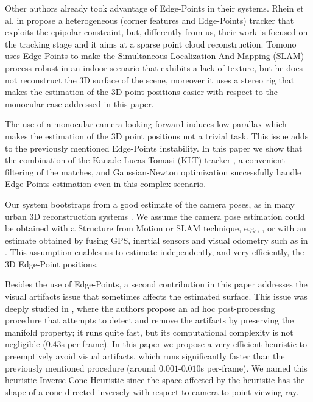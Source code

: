 Other authors \cite{Rhein_et_al13, Tomono09} already took advantage of Edge-Points in their systems. Rhein et al. in \cite{Rhein_et_al13} propose a heterogeneous (corner features and Edge-Points) tracker that exploits the epipolar constraint, but, differently from us, their work is focused on the tracking stage and it aims at a sparse point cloud reconstruction.
Tomono \cite{Tomono09}  uses Edge-Points to make  the Simultaneous Localization And Mapping (SLAM) process robust in an indoor scenario that exhibits a lack of texture, but he does not reconstruct the 3D surface of the scene, moreover it uses a stereo rig that makes the estimation of the 3D point positions easier with respect to the monocular case addressed in this paper.

The use of a monocular camera looking forward induces low parallax which makes  the estimation of the 3D point positions not a trivial task. This issue adds to the previously mentioned Edge-Points instability. 
In this paper we show that the combination of the  Kanade-Lucas-Tomasi (KLT) tracker \cite{Lucas_Kanade81}, a convenient filtering of the matches, and Gaussian-Newton optimization successfully handle Edge-Points estimation even in this complex scenario. 

Our system bootstraps from a good estimate of the camera poses, as in many urban 3D reconstruction systems \cite{ Pollefeys_et_al_08, Cornelis_et_al08}. 
We assume the camera pose estimation could be obtained with a Structure from Motion or SLAM technique, e.g., \cite{Snavely_et_al06},  or with an estimate obtained by fusing GPS, inertial sensors and visual odometry such as in \cite{Cucci_Matteucci14}.
This assumption enables us to estimate independently, and very efficiently, the 3D Edge-Point positions.

Besides the use of Edge-Points, a second contribution in this paper addresses the visual artifacts issue that sometimes affects the estimated surface.
This issue was deeply studied in \cite{litvinov_Lhiuller14}, where the authors propose an ad hoc post-processing procedure that attempts to detect and remove the artifacts by preserving the manifold property; it runs quite fast, but its computational complexity is not negligible ($0.43$s per-frame).  
In this paper we propose a very efficient heuristic to preemptively avoid visual artifacts, which runs significantly faster than the previously mentioned procedure (around $0.001$-$0.010$s per-frame). We named this heuristic Inverse Cone Heuristic since the space affected by the heuristic has the shape of a cone directed inversely with respect to camera-to-point viewing ray.

